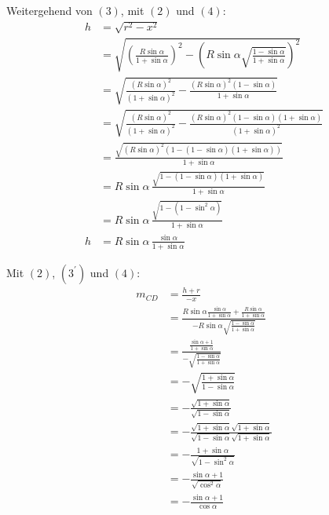 \documentclass[12pt,a4paper,oneside]{article}
\begin{document}
\goodbreak
\begin{samepage}
	Weitergehend von $(3)$, mit $(2)$ und $(4)$: \nopagebreak
	\begin{align*}
		h &= \sqrt{r^2-x^2} \\
		&= \sqrt{\left(\frac{R\sin\alpha}{1+\sin\alpha}\right)^2 - \left(R\sin\alpha\sqrt{\frac{1-\sin\alpha}{1+\sin\alpha}}\right)^2} \\
		&= \sqrt{\frac{(R\sin\alpha)^2}{(1+\sin\alpha)^2} - \frac{(R\sin\alpha)^2(1-\sin\alpha)}{1+\sin\alpha}} \\
		&= \sqrt{\frac{(R\sin\alpha)^2}{(1+\sin\alpha)^2} - \frac{(R\sin\alpha)^2(1-\sin\alpha)(1+\sin\alpha)}{(1+\sin\alpha)^2}} \\
		&= \frac{\sqrt{(R\sin\alpha)^2(1-(1-\sin\alpha)(1+\sin\alpha))}}{1+\sin\alpha} \\
		&= R\sin\alpha \, \frac{\sqrt{1-(1-\sin\alpha)(1+\sin\alpha)}}{1+\sin\alpha} \\
		&= R\sin\alpha \, \frac{\sqrt{1-(1-\sin^2\alpha)}}{1+\sin\alpha} \\
		h &= R\sin\alpha \, \frac{\sin\alpha}{1+\sin\alpha} \tag{$3^\prime$}
	\end{align*}
\end{samepage}
\goodbreak
\begin{samepage}
	Mit $(2)$, $(3^\prime)$ und $(4)$: \nopagebreak
	\begin{align*}
		m_{CD} &= \frac{h+r}{-x} \\
		&= \frac{R\sin\alpha \frac{\sin\alpha}{1+\sin\alpha} + \frac{R\sin\alpha}{1+\sin\alpha}}{-R\sin\alpha\sqrt{\frac{1-\sin\alpha}{1+\sin\alpha}}} \\
		&= \frac{\frac{\sin\alpha+1}{1+\sin\alpha}}{-\sqrt{\frac{1-\sin\alpha}{1+\sin\alpha}}} \\
		&= -\sqrt{\frac{1+\sin\alpha}{1-\sin\alpha}} \\
		&= -\frac{\sqrt{1+\sin\alpha}}{\sqrt{1-\sin\alpha}} \\
		&= -\frac{\sqrt{1+\sin\alpha}\sqrt{1+\sin\alpha}}{\sqrt{1-\sin\alpha}\sqrt{1+\sin\alpha}} \\
		&= -\frac{1+\sin\alpha}{\sqrt{1 - \sin^2\alpha}} \\
		&= -\frac{\sin\alpha+1}{\sqrt{\cos^2\alpha}} \\[15pt]
		&= -\frac{\sin\alpha+1}{\cos\alpha}
	\end{align*}
\end{samepage}
\goodbreak
\end{document}
